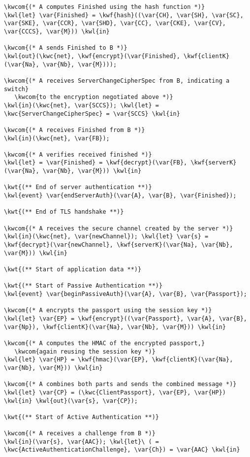 \begin{Verbatim}[commandchars=\\\{\}, codes={\catcode`$=3}]
\kwcom{(* A computes Finished using the hash function *)}
\kwl{let} \var{Finished} = \kwf{hash}((\var{CH}, \var{SH}, \var{SC}, \var{SKE}, \var{CCR}, \var{SHD}, \var{CC}, \var{CKE}, \var{CV},
\var{CCCS}, \var{M})) \kwl{in}

\kwcom{(* A sends Finished to B *)}
\kwl{out}(\kwc{net}, \kwf{encrypt}(\var{Finished}, \kwf{clientK}(\var{Na}, \var{Nb}, \var{M})));

\kwcom{(* A receives ServerChangeCipherSpec from B, indicating a switch}
   \kwcom{to the encryption negotiated above *)}
\kwl{in}(\kwc{net}, \var{SCCS}); \kwl{let} = \kwc{ServerChangeCipherSpec} = \var{SCCS} \kwl{in}

\kwcom{(* A receives Finished from B *)}
\kwl{in}(\kwc{net}, \var{FB});

\kwcom{(* A verifies received finished *)}
\kwl{let} = \var{Finished} = \kwf{decrypt}(\var{FB}, \kwf{serverK}(\var{Na}, \var{Nb}, \var{M})) \kwl{in}

\kwt{(** End of server authentication **)}
\kwl{event} \var{endServerAuth}(\var{A}, \var{B}, \var{Finished});

\kwt{(** End of TLS handshake **)}

\kwcom{(* A receives the secure channel created by the server *)}
\kwl{in}(\kwc{net}, \var{newChannel}); \kwl{let} \var{s} = \kwf{decrypt}(\var{newChannel}, \kwf{serverK}(\var{Na}, \var{Nb},
\var{M})) \kwl{in}

\kwt{(** Start of application data **)}

\kwt{(** Start of Passive Authentication **)}
\kwl{event} \var{beginPassiveAuth}(\var{A}, \var{B}, \var{Passport}); 

\kwcom{(* A encrypts the passport using the session key *)}
\kwl{let} \var{EP} = \kwf{encrypt}((\var{Passport}, \var{A}, \var{B}, \var{Np}), \kwf{clientK}(\var{Na}, \var{Nb}, \var{M})) \kwl{in}

\kwcom{(* A computes the HMAC of the encrypted passport,}
   \kwcom{again reusing the session key *)}
\kwl{let} \var{HP} = \kwf{hmac}(\var{EP}, \kwf{clientK}(\var{Na}, \var{Nb}, \var{M})) \kwl{in}

\kwcom{(* A combines both parts and sends the combined message *)}
\kwl{let} \var{CP} = (\kwc{ClientPassport}, \var{EP}, \var{HP}) \kwl{in} \kwl{out}(\var{s}, \var{CP});

\kwt{(** Start of Active Authentication **)}

\kwcom{(* A receives a challenge from B *)}
\kwl{in}(\var{s}, \var{AAC}); \kwl{let}\ ( = \kwc{ActiveAuthenticationChallenge}, \var{Ch}) = \var{AAC} \kwl{in}


\end{Verbatim}
